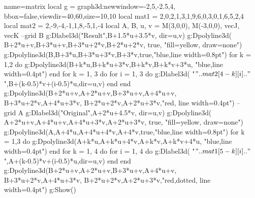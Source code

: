 \documentclass[border=5pt]{standalone}%
\begin{document}
%
\begin{luadraw}{name=matrix}
local g = graph3d:new{window={-2,5,-2.5,4}, bbox=false,viewdir={40,60},size={10,10}}
local mat1 = {{2,0,2,1},{3,1,9,6},{0,3,0,1},{6,5,2,4}}
local mat2 = {{2,-9,-4},{-1,1,8},{-5,1,-4}}
local A, B, u, v = M(3,0,0), M(-3,0,0), vecJ, vecK
--grid B
g:Dlabel3d("Result",B+1.5*u+3.5*v, {dir={u,v}})
g:Dpolyline3d( {B+2*u+v,B+3*u+v,B+3*u+2*v,B+2*u+2*v}, true, "fill=yellow, draw=none")
g:Dpolyline3d({B,B+3*u,B+3*u+3*v,B+3*v},true,"blue,line width=0.8pt")
for k = 1,2 do
    g:Dpolyline3d({{B+k*u,B+k*u+3*v},{B+k*v,B+k*v+3*u}}, "blue,line width=0.4pt")
end
for k = 1, 3 do
    for i = 1, 3 do
        g:Dlabel3d( "$"..mat2[4-k][i].."$",B+(k-0.5)*v+(i-0.5)*u,{dir={u,v}})
    end
end
g:Dpolyline3d({{B+2*u+v,A+2*u+v},{B+3*u+v,A+4*u+v}, {B+3*u+2*v,A+4*u+3*v}, {B+2*u+2*v,A+2*u+3*v}},"red, line width=0.4pt")
--grid A
g:Dlabel3d("Original",A+2*u+4.5*v, {dir={u,v}})
g:Dpolyline3d( {A+2*u+v,A+4*u+v,A+4*u+3*v,A+2*u+3*v}, true, "fill=yellow, draw=none")
g:Dpolyline3d({A,A+4*u,A+4*u+4*v,A+4*v},true,"blue,line width=0.8pt")
for k = 1,3 do
    g:Dpolyline3d({{A+k*u,A+k*u+4*v},{A+k*v,A+k*v+4*u}}, "blue,line width=0.4pt")
end
for k = 1, 4 do
    for i = 1, 4 do
        g:Dlabel3d( "$"..mat1[5-k][i].."$",A+(k-0.5)*v+(i-0.5)*u,{dir={u,v}})
    end
end
g:Dpolyline3d({{B+2*u+v,A+2*u+v},{B+3*u+v,A+4*u+v}, {B+3*u+2*v,A+4*u+3*v}, {B+2*u+2*v,A+2*u+3*v}},"red,dotted, line width=0.4pt")
g:Show()
\end{luadraw}
\end{document}
